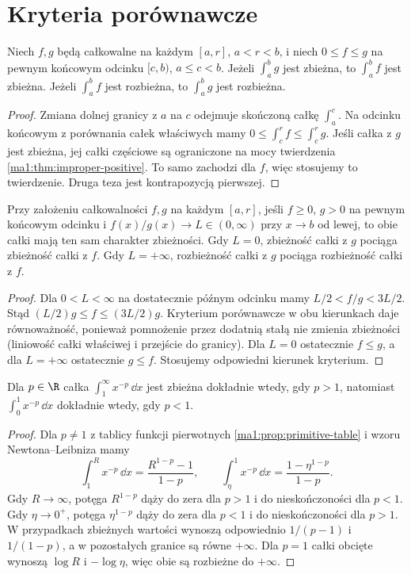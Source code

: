 \section{Kryteria porównawcze}
\begin{twierdzenie}
\label{ma1:thm:improper-comparison}
Niech $f,g$ będą całkowalne na każdym $[a,r]$, $a<r<b$, i niech $0\le f\le g$ na pewnym końcowym odcinku $[c,b)$, $a\le c<b$. Jeżeli $\int_a^b g$ jest zbieżna, to $\int_a^b f$ jest zbieżna. Jeżeli $\int_a^b f$ jest rozbieżna, to $\int_a^b g$ jest rozbieżna.
\end{twierdzenie}
\begin{proof}
Zmiana dolnej granicy z $a$ na $c$ odejmuje skończoną całkę $\int_a^c$. Na odcinku końcowym z porównania całek właściwych mamy $0\le\int_c^r f\le\int_c^r g$. Jeśli całka z $g$ jest zbieżna, jej całki częściowe są ograniczone na mocy twierdzenia \ref{ma1:thm:improper-positive}. To samo zachodzi dla $f$, więc stosujemy to twierdzenie. Druga teza jest kontrapozycją pierwszej.
\end{proof}
\begin{wniosek}
\label{ma1:cor:improper-limit-comparison}
Przy założeniu całkowalności $f,g$ na każdym $[a,r]$, jeśli $f\ge0$, $g>0$ na pewnym końcowym odcinku i $f(x)/g(x)\to L\in(0,\infty)$ przy $x\to b$ od lewej, to obie całki mają ten sam charakter zbieżności. Gdy $L=0$, zbieżność całki z $g$ pociąga zbieżność całki z $f$. Gdy $L=+\infty$, rozbieżność całki z $g$ pociąga rozbieżność całki z $f$.
\end{wniosek}
\begin{proof}
Dla $0<L<\infty$ na dostatecznie późnym odcinku mamy $L/2<f/g<3L/2$. Stąd $(L/2)g\le f\le(3L/2)g$. Kryterium porównawcze w obu kierunkach daje równoważność, ponieważ pomnożenie przez dodatnią stałą nie zmienia zbieżności (liniowość całki właściwej i przejście do granicy). Dla $L=0$ ostatecznie $f\le g$, a dla $L=+\infty$ ostatecznie $g\le f$. Stosujemy odpowiedni kierunek kryterium.
\end{proof}
\begin{przyklad}
\label{ma1:ex:improper-p-integrals}
Dla $p\in\R$ całka $\int_1^\infty x^{-p}\,\dd x$ jest zbieżna dokładnie wtedy, gdy $p>1$, natomiast $\int_0^1 x^{-p}\,\dd x$ dokładnie wtedy, gdy $p<1$.
\end{przyklad}
\begin{proof}
Dla $p\ne1$ z tablicy funkcji pierwotnych \ref{ma1:prop:primitive-table} i wzoru Newtona--Leibniza mamy
\[
 \int_1^R x^{-p}\,\dd x=\frac{R^{1-p}-1}{1-p},\qquad
 \int_\eta^1 x^{-p}\,\dd x=\frac{1-\eta^{1-p}}{1-p}.
\]
Gdy $R\to\infty$, potęga $R^{1-p}$ dąży do zera dla $p>1$ i do nieskończoności dla $p<1$. Gdy $\eta\to0^+$, potęga $\eta^{1-p}$ dąży do zera dla $p<1$ i do nieskończoności dla $p>1$. W przypadkach zbieżnych wartości wynoszą odpowiednio $1/(p-1)$ i $1/(1-p)$, a w pozostałych granice są równe $+\infty$. Dla $p=1$ całki obcięte wynoszą $\log R$ i $-\log\eta$, więc obie są rozbieżne do $+\infty$.
\end{proof}

